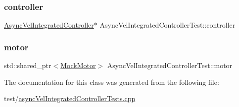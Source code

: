 \subsubsection{\texorpdfstring{controller}{controller}}
{\footnotesize\ttfamily \mbox{\hyperlink{classokapi_1_1AsyncVelIntegratedController}{Async\+Vel\+Integrated\+Controller}}$\ast$ Async\+Vel\+Integrated\+Controller\+Test\+::controller\hspace{0.3cm}{\ttfamily [protected]}}

\mbox{\label{classAsyncVelIntegratedControllerTest_ad4f999c316310781f9a739a8bc415de4}} 
\subsubsection{\texorpdfstring{motor}{motor}}
{\footnotesize\ttfamily std\+::shared\+\_\+ptr$<$\mbox{\hyperlink{classokapi_1_1MockMotor}{Mock\+Motor}}$>$ Async\+Vel\+Integrated\+Controller\+Test\+::motor\hspace{0.3cm}{\ttfamily [protected]}}



The documentation for this class was generated from the following file\+:\begin{DoxyCompactItemize}
\item 
test/\mbox{\hyperlink{asyncVelIntegratedControllerTests_8cpp}{async\+Vel\+Integrated\+Controller\+Tests.\+cpp}}\end{DoxyCompactItemize}

